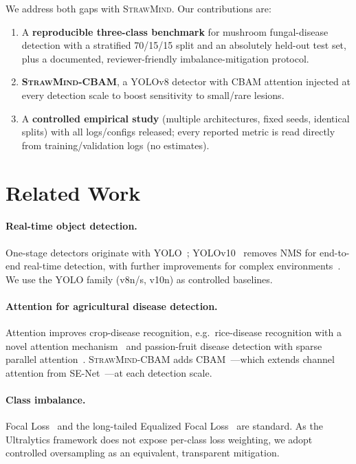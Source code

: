 \documentclass[11pt]{article}
\newcommand{\sm}{\textsc{StrawMind}}
\newcommand{\smc}{\textsc{StrawMind-CBAM}}
\begin{document}
We address both gaps with \sm. Our contributions are:
\begin{enumerate}
  \item A \textbf{reproducible three-class benchmark} for mushroom fungal-disease detection with a
  stratified 70/15/15 split and an absolutely held-out test set, plus a documented, reviewer-friendly
  imbalance-mitigation protocol.
  \item \textbf{\smc}, a YOLOv8 detector with CBAM attention injected at every detection scale to
  boost sensitivity to small/rare lesions.
  \item A \textbf{controlled empirical study} (multiple architectures, fixed seeds, identical splits)
  with all logs/configs released; every reported metric is read directly from training/validation
  logs (no estimates).
\end{enumerate}

\section{Related Work}
\paragraph{Real-time object detection.} One-stage detectors originate with YOLO~\cite{redmon2016yolo};
YOLOv10~\cite{wang2024yolov10} removes NMS for end-to-end real-time detection, with further
improvements for complex environments~\cite{wu2025improvedyolov10}. We use the YOLO family
(v8n/s, v10n) as controlled baselines.
\paragraph{Attention for agricultural disease detection.} Attention improves crop-disease recognition,
e.g.\ rice-disease recognition with a novel attention mechanism~\cite{chen2023domainrice} and
passion-fruit disease detection with sparse parallel attention~\cite{he2025passionfruit}. \smc{}
adds CBAM~\cite{woo2018cbam}---which extends channel attention from SE-Net~\cite{hu2018senet}---at each detection scale.
\paragraph{Class imbalance.} Focal Loss~\cite{lin2017focal} and the long-tailed Equalized Focal
Loss~\cite{li2022equalized} are standard. As the Ultralytics framework does not expose per-class
loss weighting, we adopt controlled oversampling as an equivalent, transparent mitigation.
\end{document}
